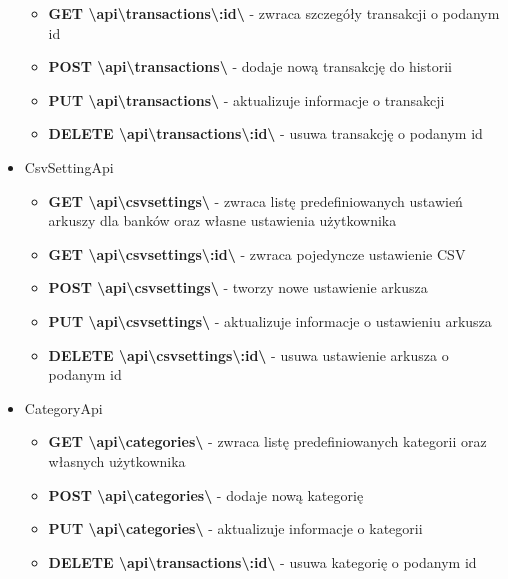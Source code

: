 \documentclass{article}
\begin{document}
\begin{itemize}
\begin{itemize}
				\item \textbf{GET \textbackslash{api}\textbackslash{transactions}\textbackslash{:id}\textbackslash} - zwraca szczegóły transakcji o podanym id
				\item \textbf{POST \textbackslash{api}\textbackslash{transactions}\textbackslash} - dodaje nową transakcję do historii
				\item \textbf{PUT \textbackslash{api}\textbackslash{transactions}\textbackslash} - aktualizuje informacje o transakcji
				\item \textbf{DELETE \textbackslash{api}\textbackslash{transactions}\textbackslash{:id}\textbackslash} - usuwa transakcję o podanym id
			\end{itemize}
		\item CsvSettingApi
			\begin{itemize}
				\item \textbf{GET \textbackslash{api}\textbackslash{csvsettings}\textbackslash} - zwraca listę predefiniowanych ustawień arkuszy dla banków oraz własne ustawienia użytkownika
				\item \textbf{GET \textbackslash{api}\textbackslash{csvsettings}\textbackslash{:id}\textbackslash} - zwraca pojedyncze ustawienie CSV
				\item \textbf{POST \textbackslash{api}\textbackslash{csvsettings}\textbackslash} - tworzy nowe ustawienie arkusza
				\item \textbf{PUT \textbackslash{api}\textbackslash{csvsettings}\textbackslash} - aktualizuje informacje o ustawieniu arkusza
				\item \textbf{DELETE \textbackslash{api}\textbackslash{csvsettings}\textbackslash{:id}\textbackslash} - usuwa ustawienie arkusza o podanym id
			\end{itemize}
		\item CategoryApi
			\begin{itemize}
				\item \textbf{GET \textbackslash{api}\textbackslash{categories}\textbackslash} - zwraca listę predefiniowanych kategorii oraz własnych użytkownika
				\item \textbf{POST \textbackslash{api}\textbackslash{categories}\textbackslash} - dodaje nową kategorię
				\item \textbf{PUT \textbackslash{api}\textbackslash{categories}\textbackslash} - aktualizuje informacje o kategorii
				\item \textbf{DELETE \textbackslash{api}\textbackslash{transactions}\textbackslash{:id}\textbackslash} - usuwa kategorię o podanym id
			\end{itemize}
	\end{itemize}
\end{document}
